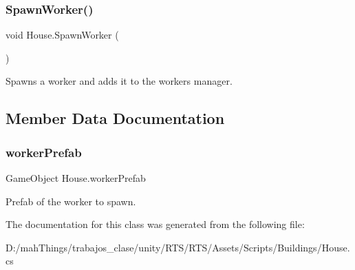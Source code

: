 \subsubsection{\texorpdfstring{Spawn\+Worker()}{SpawnWorker()}}
{\footnotesize\ttfamily void House.\+Spawn\+Worker (\begin{DoxyParamCaption}{ }\end{DoxyParamCaption})}



Spawns a worker and adds it to the workers manager. 



\subsection{Member Data Documentation}
\mbox{\label{class_house_a372877c84935b2aa6e7968099c6619d7}} 
\subsubsection{\texorpdfstring{worker\+Prefab}{workerPrefab}}
{\footnotesize\ttfamily Game\+Object House.\+worker\+Prefab}



Prefab of the worker to spawn. 



The documentation for this class was generated from the following file\+:\begin{DoxyCompactItemize}
\item 
D\+:/mah\+Things/trabajos\+\_\+clase/unity/\+R\+T\+S/\+R\+T\+S/\+Assets/\+Scripts/\+Buildings/House.\+cs\end{DoxyCompactItemize}

